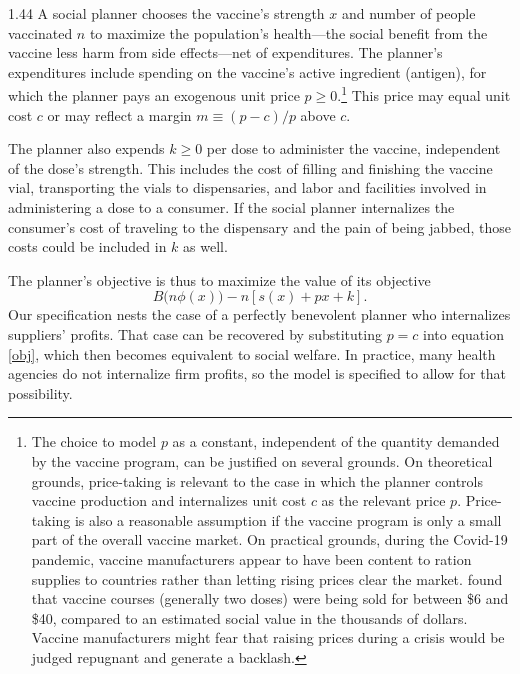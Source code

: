 \documentclass[12pt]{article}
\newcommand{\efficacy}{\phi}
\newcommand{\side}{s}
\newcommand{\benefit}{B}
\begin{document}
\begin{spacing}{1.44}
A social planner chooses the vaccine's strength $x$ and number of
people vaccinated $n$ to maximize the population's health---the social
benefit from the vaccine less harm from side effects---net of
expenditures. The planner's expenditures include spending on the
vaccine's active ingredient (antigen), for which the planner pays an
exogenous unit price $p \geq 0$.\footnote{\label{fn:Castillo} The
choice to model $p$ as a constant, independent of the quantity
demanded by the vaccine program, can be justified on several
grounds. On theoretical grounds, price-taking is relevant to the case
in which the planner controls vaccine production and internalizes unit
cost $c$ as the relevant price $p$. Price-taking is also a reasonable
assumption if the vaccine program is only a small part of the overall
vaccine market. On practical grounds, during the Covid-19 pandemic,
vaccine manufacturers appear to have been content to ration supplies
to countries rather than letting rising prices clear the
market. \citet{Castillo2021} found that vaccine courses (generally two
doses) were being sold for between \$6 and \$40, compared to an
estimated social value in the thousands of dollars. Vaccine
manufacturers might fear that raising prices during a crisis would be
judged repugnant \citep{Kahneman1986} and generate a backlash.}  This
price may equal unit cost $c$ or may reflect a margin $m \equiv
(p-c)/p$ above $c$.

The planner also expends $k \geq 0$ per dose to administer the
vaccine, independent of the dose's strength. This includes the cost of
filling and finishing the vaccine vial, transporting the vials to
dispensaries, and labor and facilities involved in administering a
dose to a consumer. If the social planner internalizes the consumer's
cost of traveling to the dispensary and the pain of being jabbed,
those costs could be included in $k$ as well.

The planner's objective is thus to maximize the value of its objective
\begin{equation}
\label{obj}
\benefit \bigl( n\efficacy(x) \bigr) - n \left[ \side(x) + px + k
  \right].
\end{equation}
Our specification nests the case of a perfectly benevolent planner who
internalizes suppliers' profits. That case can be recovered by
substituting $p = c$ into equation \eqref{obj}, which then becomes
equivalent to social welfare. In practice, many health agencies do not
internalize firm profits, so the model is specified to allow for that
possibility.


\end{spacing}
\end{document}
